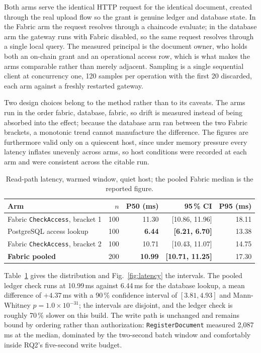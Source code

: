 \documentclass[preprint,12pt]{elsarticle}
\begin{document}
Both arms serve the identical HTTP request for the identical document, created
through the real upload flow so the grant is genuine ledger and database state.
In the Fabric arm the request resolves through a chaincode evaluate; in the
database arm the gateway runs with Fabric disabled, so the same request resolves
through a single local query. The measured principal is the document owner, who
holds both an on-chain grant and an operational access row, which is what makes
the arms comparable rather than merely adjacent. Sampling is a single sequential
client at concurrency one, 120 samples per operation with the first 20 discarded,
each arm against a freshly restarted gateway.

Two design choices belong to the method rather than to its caveats. The arms
run in the order fabric, database, fabric, so drift is measured instead of
being absorbed into the effect; because the database arm ran between the two
Fabric brackets, a monotonic trend cannot manufacture the difference. The
figures are furthermore valid only on a quiescent host, since under memory
pressure every latency inflates unevenly across arms, so host conditions were
recorded at each arm and were consistent across the citable run.

\begin{table}[!t]
\centering
\caption{Read-path latency, warmed window, quiet host; the pooled Fabric
median is the reported figure.}
\label{tab:readpath}
\footnotesize
\setlength{\tabcolsep}{5pt}
\begin{tabular}{@{}lrrrr@{}}
\toprule
Arm & $n$ & P50 (ms) & 95\,\% CI & P95 (ms) \\
\midrule
Fabric \texttt{CheckAccess}, bracket 1 & 100 & 11.30 & [10.86, 11.96] & 18.11 \\
PostgreSQL access lookup               & 100 & \textbf{6.44}  & \textbf{[6.21, 6.70]}   & 13.38 \\
Fabric \texttt{CheckAccess}, bracket 2 & 100 & 10.71 & [10.43, 11.07] & 14.75 \\
\midrule
\textbf{Fabric pooled}                 & 200 & \textbf{10.99} & \textbf{[10.71, 11.25]} & 17.30 \\
\bottomrule
\end{tabular}
\end{table}

Table~\ref{tab:readpath} gives the distribution and Fig.~\ref{fig:latency}
the intervals. The pooled ledger check runs at 10.99\,ms against 6.44\,ms for
the database lookup, a mean difference of $+4.37$\,ms with a 90\,\%
confidence interval of $[3.81, 4.93]$ and Mann-Whitney
$p = 1.0 \times 10^{-31}$; the intervals are disjoint, and the ledger check is
roughly 70\,\% slower on this build. The write path is unchanged and remains bound by ordering rather
than authorization: \texttt{RegisterDocument} measured 2{,}087\,ms at the median,
dominated by the two-second batch window and comfortably inside RQ2's
five-second write budget.
\end{document}
